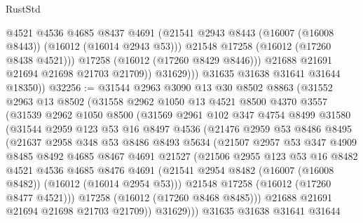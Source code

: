 \begin{lexlean}{RustStd}
\begin{coremodule}
                      @4521
                      @4536
                      @4685
                      @8437
                      @4691
                      (@21541 @2943 @8443 (@16007 (@16008 @8443)) (@16012 (@16014 @2943 @53)))
                      @21548
                      @17258
                      (@16012 (@17260 @8438 @4521)))
                    @17258
                    (@16012 (@17260 @8429 @8446)))
                  @21688
                  @21691
                  @21694
                  @21698
                  @21703
                  @21709))
              @31629)))
        @31635
        @31638
        @31641
        @31644
        @18350))
@32256 := @31544
    @2963
    @3090
    @13
    @30
    @8502
    @8863
    (@31552
      @2963
      @13
      @8502
      (@31558
        @2962
        @1050
        @13
        @4521
        @8500
        @4370
        @3557
        (@31539
          @2962
          @1050
          @8500
          (@31569
            @2961
            @102
            @347
            @4754
            @8499
            @31580
            (@31544
              @2959
              @123
              @53
              @16
              @8497
              @4536
              (@21476
                @2959
                @53
                @8486
                @8495
                (@21637
                  @2958
                  @348
                  @53
                  @8486
                  @8493
                  @5634
                  (@21507
                    @2957
                    @53
                    @347
                    @4909
                    @8485
                    @8492
                    @4685
                    @8467
                    @4691
                    @21527
                    (@21506
                      @2955
                      @123
                      @53
                      @16
                      @8482
                      @4521
                      @4536
                      @4685
                      @8476
                      @4691
                      (@21541 @2954 @8482 (@16007 (@16008 @8482)) (@16012 (@16014 @2954 @53)))
                      @21548
                      @17258
                      (@16012 (@17260 @8477 @4521)))
                    @17258
                    (@16012 (@17260 @8468 @8485)))
                  @21688
                  @21691
                  @21694
                  @21698
                  @21703
                  @21709))
              @31629)))
        @31635
        @31638
        @31641
        @31644

\end{coremodule}
\end{lexlean}

